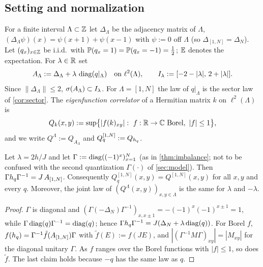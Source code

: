 \subsection{Setting and normalization}\label{sec:onebody:setting}

For a finite interval $\Lambda\subset\mathbb{Z}$ let $\Delta_\Lambda$ be the adjacency matrix of $\Lambda$,
$(\Delta_\Lambda\psi)(x)=\psi(x+1)+\psi(x-1)$ with $\psi:=0$ off $\Lambda$ (so $\Delta_{[1,N]}=\Delta_N$).
Let $(q_x)_{x\in\mathbb{Z}}$ be i.i.d.\ with $\mathbb{P}(q_x=1)=\mathbb{P}(q_x=-1)=\tfrac12$; $\mathbb{E}$ denotes the expectation.
For $\lambda\in\mathbb{R}$ set
\begin{equation}\label{eq:Alam}
  A_\Lambda:=\Delta_\Lambda+\lambda\,\operatorname{diag}(q|_\Lambda)\quad\text{on }\ell^2(\Lambda),\qquad
  I_\lambda:=[-2-|\lambda|,\,2+|\lambda|] .
\end{equation}
Since $\|\Delta_\Lambda\|\le2$, $\sigma(A_\Lambda)\subset I_\lambda$.  For $\Lambda=[1,N]$ the law of
$q|_\Lambda$ is the sector law of \cref{cor:sector}.  The \emph{eigenfunction correlator} of a
Hermitian matrix $k$ on $\ell^2(\Lambda)$ is
\begin{equation}\label{eq:Qdef}
  Q_k(x,y):=\sup\bigl\{|f(k)_{xy}|:\ f:\R\to\C\ \text{Borel},\ |f|\le1\bigr\},
\end{equation}
and we write $Q^\Lambda:=Q_{A_\Lambda}$ and $Q^{[1,N]}_q:=Q_{h_{q}}$.

\begin{lemma}[Normalization]\label{lem:normalization}
Let $\lambda=2h/J$ and let $\Gamma:=\operatorname{diag}((-1)^x)_{x=1}^N$ (as in \cref{thm:imbalance}; not to be confused
with the second quantization $\Gamma(\cdot)$ of \cref{sec:model}).  Then $\Gamma h_{q}\Gamma^{-1}=J\,A_{[1,N]}$.  Consequently
$Q^{[1,N]}_q(x,y)=Q^{[1,N]}(x,y)$ for all $x,y$ and every $q$.  Moreover, the joint law of
$(Q^\Lambda(x,y))_{x,y\in\Lambda}$ is the same for $\lambda$ and $-\lambda$.
\end{lemma}

\begin{proof}
$\Gamma$ is diagonal and $(\Gamma(-\Delta_N)\Gamma^{-1})_{x,x\pm1}=-(-1)^x(-1)^{x\pm1}=1$, while $\Gamma\operatorname{diag}(q)\Gamma^{-1}=\operatorname{diag}(q)$;
hence $\Gamma h_{q}\Gamma^{-1}=J(\Delta_N+\lambda\operatorname{diag}(q))$.  For Borel $f$, $f(h_{q})=\Gamma^{-1}\tilde f(A_{[1,N]})\Gamma$ with
$\tilde f(E):=f(JE)$, and $|(\Gamma^{-1}M\Gamma)_{xy}|=|M_{xy}|$ for the diagonal unitary $\Gamma$.  As $f$ ranges over the
Borel functions with $|f|\le1$, so does $\tilde f$.  The last claim holds because $-q$ has the same law as $q$.
\end{proof}

